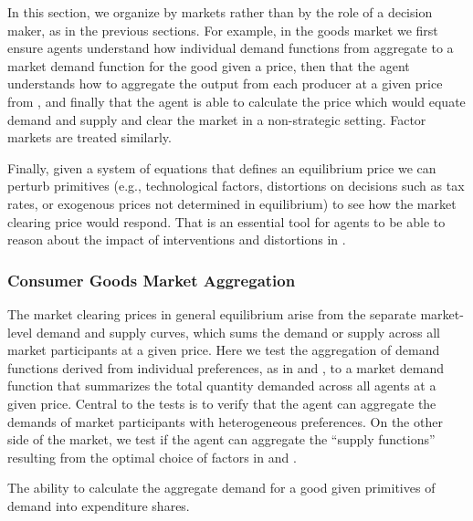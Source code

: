  In this section, we organize by markets rather than by the role of a decision maker, as in the previous sections.  For example, in the goods market we first ensure agents understand how individual demand functions from  aggregate to a market demand function for the good given a price, then that the agent understands how to aggregate the output from each producer at a given price from , and finally that the agent is able to calculate the price which would equate demand and supply and clear the market in a non-strategic setting.  Factor markets are treated similarly.

Finally, given a system of equations that defines an equilibrium price we can perturb primitives (e.g., technological factors, distortions on decisions such as tax rates, or exogenous prices not determined in equilibrium) to see how the market clearing price would respond.  That is an essential tool for agents to be able to reason about the impact of interventions and distortions in .

\subsubsection{Consumer Goods Market Aggregation}\label{mod:consumer_aggregation}
The market clearing prices in general equilibrium arise from the separate market-level demand and supply curves, which sums the demand or supply across all market participants at a given price.  Here we test the aggregation of demand functions derived from individual preferences, as in  and  , to a market demand function that summarizes the total quantity demanded across all agents at a given price.  Central to the tests is to verify that the agent can aggregate the demands of market participants with heterogeneous preferences.  On the other side of the market, we test if the agent can aggregate the ``supply functions'' resulting from the optimal choice of factors in  and .

\begin{el} \label{el:agg_consumer_demand}
    {The ability to calculate the aggregate demand for a good given primitives of demand into expenditure shares.}   
\end{el}




